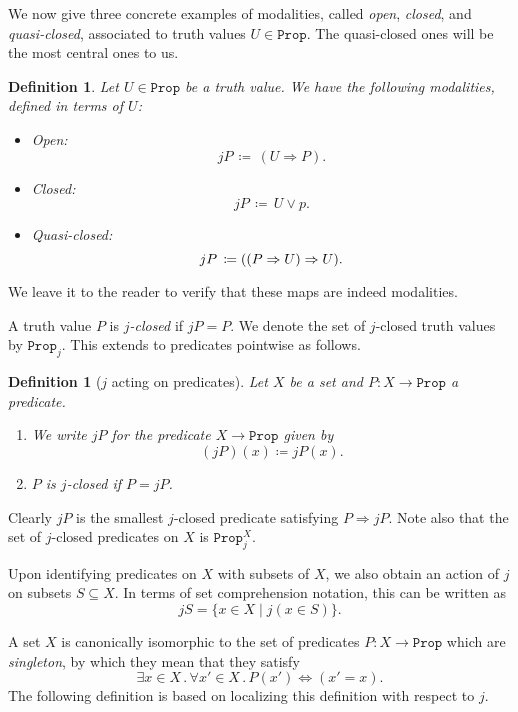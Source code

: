 \documentclass[reqno,11pt]{amsproc}
\theoremstyle{plain}
\newtheorem{definition}[theorem]{Definition}
\theoremstyle{definition}
\newcommand{\Const}[1]{\mathtt{#1}}
\renewcommand{\to}[1][]{\xrightarrow{#1}}
\newcommand{\prop}{\Const{Prop}}
\newcommand{\imp}{\Rightarrow}
\let\originalleft\left
\let\originalright\right
\renewcommand{\left}{\mathopen{}\mathclose\bgroup\originalleft}
\renewcommand{\right}{\aftergroup\egroup\originalright}
\numberwithin{equation}{section}
\begin{document}
We now give three concrete examples of modalities, called \emph{open}, \emph{closed}, and \emph{quasi-closed}, associated to truth values $U \in \prop$. The quasi-closed ones will be the most central ones to us.

\begin{definition}
	\label{open_closed_qc}
	Let $U \in \prop$ be a truth value. We have the following modalities, defined in terms of $U$:
	\begin{itemize}
		\item Open:
			\[
				jP \, \coloneqq \, (U \imp P).
			\]
		\item Closed:
			\[
				jP \, \coloneqq \, U \lor p.
			\]
		\item Quasi-closed:
			\[
				jP \, \coloneqq \left( (P \imp U) \imp U \right).
			\]
	\end{itemize}
\end{definition}

We leave it to the reader to verify that these maps are indeed modalities.

A truth value $P$ is \emph{$j$-closed} if $jP = P$. We denote the set of $j$-closed truth values by $\prop_j$. This extends to predicates pointwise as follows.

\begin{definition}[$j$ acting on predicates]\label{def.j_closed_props}
	Let $X$ be a set and $P \colon X \to \prop$ a predicate.
	\begin{enumerate}
		\item We write $jP$ for the predicate $X \to \prop$ given by
			\[
				(jP)(x) \coloneqq jP(x).	
			\]
		\item $P$ is \emph{$j$-closed} if $P = jP$. 
	\end{enumerate}
\end{definition}

Clearly $jP$ is the smallest $j$-closed predicate satisfying $P \imp jP$. Note also that the set of $j$-closed predicates on $X$ is $\prop_j^X$.

Upon identifying predicates on $X$ with subsets of $X$, we also obtain an action of $j$ on subsets $S \subseteq X$. In terms of set comprehension notation, this can be written as
\[
	jS = \{ x \in X \mid j(x \in S) \}.
\]

A set $X$ is canonically isomorphic to the set of predicates $P \colon X \to \prop$ which are \emph{singleton}, by which they mean that they satisfy
\[
	\exists x \in X \, . \, \forall x' \in X \, . \, P(x') \Leftrightarrow (x' = x).
\]
The following definition is based on localizing this definition with respect to $j$.
\end{document}
